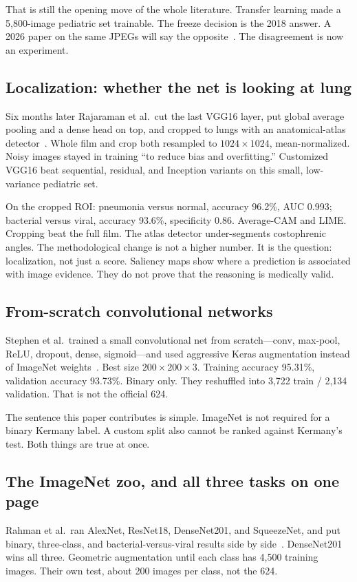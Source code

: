 \documentclass[11pt,a4paper]{article}
\begin{document}
That is still the opening move of the whole literature. Transfer learning made a 5{,}800-image pediatric set trainable. The freeze decision is the 2018 answer. A 2026 paper on the same JPEGs will say the opposite~\cite{choudhury2026}. The disagreement is now an experiment.

\subsection{Localization: whether the net is looking at lung}
Six months later Rajaraman et al.\ cut the last VGG16 layer, put global average pooling and a dense head on top, and cropped to lungs with an anatomical-atlas detector~\cite{rajaraman2018}. Whole film and crop both resampled to $1024\times 1024$, mean-normalized. Noisy images stayed in training ``to reduce bias and overfitting.'' Customized VGG16 beat sequential, residual, and Inception variants on this small, low-variance pediatric set.

On the cropped ROI: pneumonia versus normal, accuracy 96.2\%, AUC 0.993; bacterial versus viral, accuracy 93.6\%, specificity 0.86. Average-CAM and LIME. Cropping beat the full film. The atlas detector under-segments costophrenic angles. The methodological change is not a higher number. It is the question: localization, not just a score. Saliency maps show where a prediction is associated with image evidence. They do not prove that the reasoning is medically valid.

\subsection{From-scratch convolutional networks}
Stephen et al.\ trained a small convolutional net from scratch---conv, max-pool, ReLU, dropout, dense, sigmoid---and used aggressive Keras augmentation instead of ImageNet weights~\cite{stephen2019}. Best size $200\times 200\times 3$. Training accuracy 95.31\%, validation accuracy 93.73\%. Binary only. They reshuffled into 3{,}722 train / 2{,}134 validation. That is not the official 624.

The sentence this paper contributes is simple. ImageNet is not required for a binary Kermany label. A custom split also cannot be ranked against Kermany's test. Both things are true at once.

\subsection{The ImageNet zoo, and all three tasks on one page}
Rahman et al.\ ran AlexNet, ResNet18, DenseNet201, and SqueezeNet, and put binary, three-class, and bacterial-versus-viral results side by side~\cite{rahman2020}. DenseNet201 wins all three. Geometric augmentation until each class has 4{,}500 training images. Their own test, about 200 images per class, not the 624.
\end{document}
